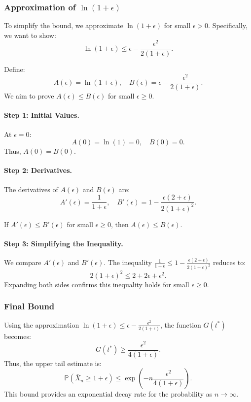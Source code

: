 \subsubsection{Approximation of \( \ln(1 + \epsilon) \)}
To simplify the bound, we approximate \( \ln(1 + \epsilon) \) for small \( \epsilon > 0 \). Specifically, we want to show:
\[
\ln(1 + \epsilon) \leq \epsilon - \frac{\epsilon^2}{2(1 + \epsilon)}.
\]

Define:
\[
A(\epsilon) = \ln(1 + \epsilon), \quad B(\epsilon) = \epsilon - \frac{\epsilon^2}{2(1 + \epsilon)}.
\]
We aim to prove \( A(\epsilon) \leq B(\epsilon) \) for small \( \epsilon \geq 0 \).

\paragraph{Step 1: Initial Values.}
At \( \epsilon = 0 \):
\[
A(0) = \ln(1) = 0, \quad B(0) = 0.
\]
Thus, \( A(0) = B(0) \).

\paragraph{Step 2: Derivatives.}
The derivatives of \( A(\epsilon) \) and \( B(\epsilon) \) are:
\[
A'(\epsilon) = \frac{1}{1 + \epsilon}, \quad
B'(\epsilon) = 1 - \frac{\epsilon(2 + \epsilon)}{2(1 + \epsilon)^2}.
\]

If \( A'(\epsilon) \leq B'(\epsilon) \) for small \( \epsilon \geq 0 \), then \( A(\epsilon) \leq B(\epsilon) \).

\paragraph{Step 3: Simplifying the Inequality.}
We compare \( A'(\epsilon) \) and \( B'(\epsilon) \). The inequality \( \frac{1}{1 + \epsilon} \leq 1 - \frac{\epsilon(2 + \epsilon)}{2(1 + \epsilon)^2} \) reduces to:
\[
2(1 + \epsilon)^2 \leq 2 + 2\epsilon + \epsilon^2.
\]
Expanding both sides confirms this inequality holds for small \( \epsilon \geq 0 \).

\subsubsection{Final Bound}

Using the approximation \( \ln(1 + \epsilon) \leq \epsilon - \frac{\epsilon^2}{2(1 + \epsilon)} \), the function \( G(t^*) \) becomes:
\[
G(t^*) \geq \frac{\epsilon^2}{4(1 + \epsilon)}.
\]
Thus, the upper tail estimate is:
\[
\mathbb{P}\left(\bar{X}_n \geq 1 + \epsilon\right) \leq \exp\left(-n \frac{\epsilon^2}{4(1 + \epsilon)}\right).
\]
This bound provides an exponential decay rate for the probability as \( n \to \infty \).

